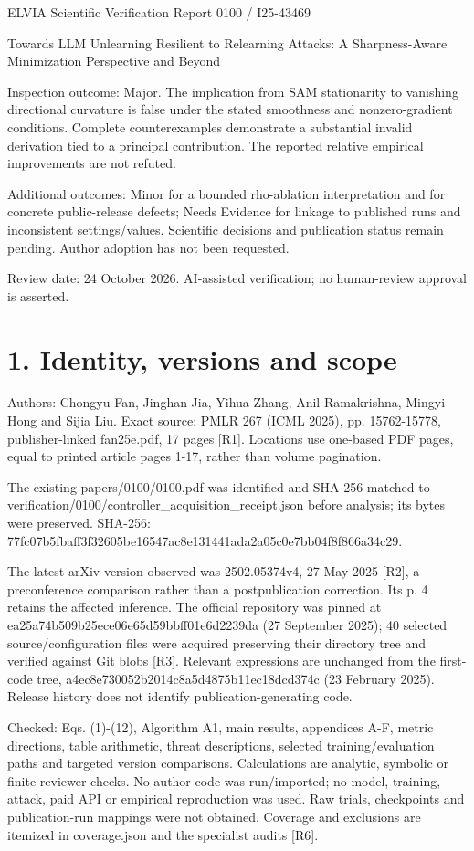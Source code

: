 \documentclass[10pt]{article}
\begin{document}
ELVIA Scientific Verification Report
0100 / I25-43469\par
Towards LLM Unlearning Resilient to Relearning Attacks: A Sharpness-Aware Minimization Perspective and Beyond\par
Inspection outcome: Major. The implication from SAM stationarity to vanishing directional curvature is false under the stated smoothness and nonzero-gradient conditions. Complete counterexamples demonstrate a substantial invalid derivation tied to a principal contribution. The reported relative empirical improvements are not refuted.\par
Additional outcomes: Minor for a bounded rho-ablation interpretation and for concrete public-release defects; Needs Evidence for linkage to published runs and inconsistent settings/values. Scientific decisions and publication status remain pending. Author adoption has not been requested.\par
Review date: 24 October 2026. AI-assisted verification; no human-review approval is asserted.\par
\section*{1. Identity, versions and scope}
Authors: Chongyu Fan, Jinghan Jia, Yihua Zhang, Anil Ramakrishna, Mingyi Hong and Sijia Liu. Exact source: PMLR 267 (ICML 2025), pp. 15762-15778, publisher-linked fan25e.pdf, 17 pages [R1]. Locations use one-based PDF pages, equal to printed article pages 1-17, rather than volume pagination.\par
The existing papers/0100/0100.pdf was identified and SHA-256 matched to verification/0100/controller\_acquisition\_receipt.json before analysis; its bytes were preserved. SHA-256: 77fc07b5fbaff3f32605be16547ac8e131441ada2a05c0e7bb04f8f866a34c29.\par
The latest arXiv version observed was 2502.05374v4, 27 May 2025 [R2], a preconference comparison rather than a postpublication correction. Its p. 4 retains the affected inference. The official repository was pinned at ea25a74b509b25ece06e65d59bbff01e6d2239da (27 September 2025); 40 selected source/configuration files were acquired preserving their directory tree and verified against Git blobs [R3]. Relevant expressions are unchanged from the first-code tree, a4ec8e730052b2014c8a5d4875b11ec18dcd374c (23 February 2025). Release history does not identify publication-generating code.\par
Checked: Eqs. (1)-(12), Algorithm A1, main results, appendices A-F, metric directions, table arithmetic, threat descriptions, selected training/evaluation paths and targeted version comparisons. Calculations are analytic, symbolic or finite reviewer checks. No author code was run/imported; no model, training, attack, paid API or empirical reproduction was used. Raw trials, checkpoints and publication-run mappings were not obtained. Coverage and exclusions are itemized in coverage.json and the specialist audits [R6].\par
\end{document}
